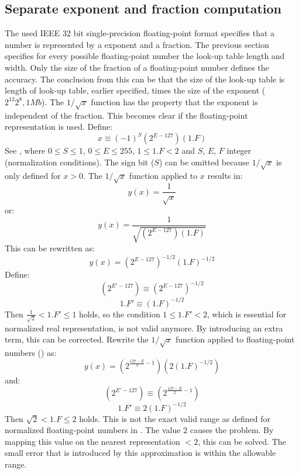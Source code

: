 \subsection{Separate exponent and fraction computation}
The used IEEE 32 bit single-precision floating-point format specifies
that a number is represented by a exponent and a fraction. The previous 
section specifies for every possible floating-point number the look-up table 
length and width. Only the size of the fraction of a floating-point number 
defines the accuracy. The conclusion from this can be that the size of the 
look-up table is length of look-up table, earlier specified, times the size of 
the exponent ($2^{12}2^{8}, 1Mb$). The $1/\sqrt{x}$  function has the 
property that the exponent is independent of the fraction. This becomes clear 
if the floating-point representation is used. Define:
\begin{equation}
x \equiv (-1)^{S}(2^{E-127})(1.F)
\label{eqn:fpdef}
\end{equation}
See , where $0 \leq S \leq 1$, $0 \leq E \leq 255$,
$1 \leq 1.F < 2$ and $S$, $E$, $F$ integer (normalization conditions). 
The sign bit ($S$) can be omitted because $1/\sqrt{x}$ is only defined 
for $x > 0$. The $1/\sqrt{x}$ function applied to $x$ results in:
\begin{equation}
y(x) = \frac{1}{\sqrt{x}}
\end{equation}
or:
\begin{equation}
y(x) = \frac{1}{\sqrt{(2^{E-127})(1.F)}}
\end{equation}
This can be rewritten as:
\begin{equation}
y(x) = (2^{E-127})^{-1/2}(1.F)^{-1/2}
\label{eqn:yx}
\end{equation}
Define:
\begin{equation}
(2^{E'-127}) \equiv (2^{E-127})^{-1/2}
\end{equation}
\begin{equation}
1.F'\equiv (1.F)^{-1/2}
\end{equation}
Then $\frac{1}{\sqrt{2}} < 1.F' \leq 1$ holds, so the condition
$1 \leq 1.F' < 2$, which is essential for normalized real representation, is
not valid anymore. By introducing an extra term, this can be corrected.
Rewrite the $1/\sqrt{x}$ function applied to floating-point numbers () as:
\begin{equation}
y(x) = (2^{\frac{127-E}{2}-1}) (2(1.F)^{-1/2})
\end{equation}
and:
\begin{equation}
(2^{E'-127}) \equiv (2^{\frac{127-E}{2}-1})
\label{eqn:exp}
\end{equation}
\begin{equation}
1.F'\equiv 2(1.F)^{-1/2}
\label{eqn:frac}
\end{equation}
Then $\sqrt{2} < 1.F \leq 2$ holds. This is not the exact valid range as
defined for normalized floating-point numbers in . 
The value $2$  causes the problem. By mapping this value on the nearest
representation $< 2$, this can be solved. The small error that is introduced
by this approximation is within the allowable range. 

